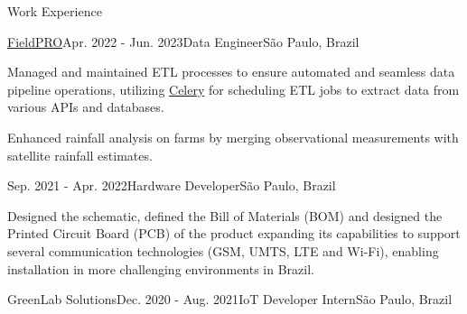 \documentclass{resume} %
\begin{document}
\begin{rSection}{Work Experience}
\begin{rSubsection}{\href{https://fieldpro.com.br/}{FieldPRO}}{Apr. 2022 - Jun. 2023}{Data Engineer}{São Paulo, Brazil}
\item Managed and maintained ETL processes to ensure automated and seamless data pipeline operations, utilizing \href{https://docs.celeryq.dev/en/stable/getting-started/introduction.html}{Celery} for scheduling ETL jobs to extract data from various APIs and databases.
\item Enhanced rainfall analysis on farms by merging observational measurements with satellite rainfall estimates.

\end{rSubsection}

\vspace{-0.2cm}

\begin{rSubsection}{}{Sep. 2021 - Apr. 2022}{Hardware Developer}{São Paulo, Brazil}

\item Designed the schematic, defined the Bill of Materials (BOM) and designed the Printed Circuit Board (PCB) of the product expanding its capabilities to support several communication technologies (GSM, UMTS, LTE and Wi-Fi), enabling installation in more challenging environments in Brazil.
\end{rSubsection}

\begin{rSubsection}{GreenLab Solutions}{Dec. 2020 - Aug. 2021}{IoT Developer Intern}{São Paulo, Brazil}


\end{rSubsection}
\end{rSection}
\end{document}
